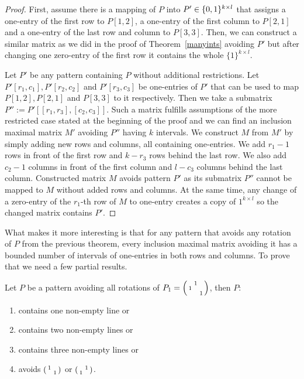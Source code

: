\begin{proof}
First, assume there is a mapping of $P$ into $P'\in\{0,1\}^{k\times l}$ that assigns a one-entry of the first row to $P[1,2]$, a one-entry of the first column to $P[2,1]$ and a one-entry of the last row and column to $P[3,3]$. Then, we can construct a similar matrix as we did in the proof of Theorem~\ref{manyints} avoiding $P'$ but after changing one zero-entry of the first row it contains the whole $\{1\}^{k\times l}$.

Let $P'$ be any pattern containing $P$ without additional restrictions. Let $P'[r_1,c_1],P'[r_2,c_2]$ and $P'[r_3,c_3]$ be one-entries of $P'$ that can be used to map $P[1,2],P[2,1]$ and $P[3,3]$ to it respectively. Then we take a submatrix $P'':=P'[[r_1,r_3],[c_2,c_3]]$. Such a matrix fulfills assumptions of the more restricted case stated at the beginning of the proof and we can find an inclusion maximal matrix $M'$ avoiding $P''$ having $k$ intervals. We construct $M$ from $M'$ by simply adding new rows and columns, all containing one-entries. We add $r_1-1$ rows in front of the first row and $k-r_3$ rows behind the last row. We also add $c_2-1$ columns in front of the first column and $l-c_3$ columns behind the last column. Constructed matrix $M$ avoids pattern $P'$ as its submatrix $P''$ cannot be mapped to $M$ without added rows and columns. At the same time, any change of a zero-entry of the $r_1$-th row of $M$ to one-entry creates a copy of ${1}^{k\times l}$ so the changed matrix contains $P'$.
\end{proof}
What makes it more interesting is that for any pattern that avoids any rotation of $P$ from the previous theorem, every inclusion maximal matrix avoiding it has a bounded number of intervals of one-entries in both rows and columns. To prove that we need a few partial results.
\begin{thm}
Let $P$ be a pattern avoiding all rotations of $P_1=\left(\begin{smallmatrix} &1& \\1& & \\ & &1\end{smallmatrix}\right)$, then $P$:
\begin{enumerate}
\item contains one non-empty line or
\item contains two non-empty lines or
\item contains three non-empty lines or
\item avoids $\left(\begin{smallmatrix}1& \\ &1\end{smallmatrix}\right)$ or $\left(\begin{smallmatrix} &1\\1& \end{smallmatrix}\right)$.
\end{enumerate}
\end{thm}
